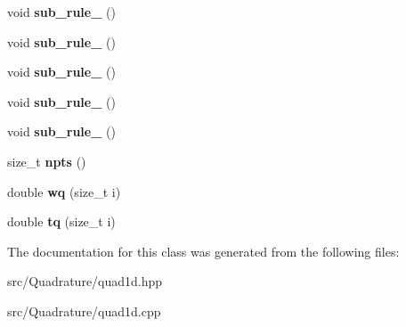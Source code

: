\begin{DoxyCompactItemize}
void {\bfseries sub\+\_\+rule\+\_} ()
\item 
\mbox{\label{classHArDCore3D_1_1LegendreGauss_a50b4238c7cade3272efe46641e1d2d3f}} 
void {\bfseries sub\+\_\+rule\+\_} ()
\item 
\mbox{\label{classHArDCore3D_1_1LegendreGauss_ae6a8077dd8cf9fc76ed1234b93691049}} 
void {\bfseries sub\+\_\+rule\+\_} ()
\item 
\mbox{\label{classHArDCore3D_1_1LegendreGauss_aad37934da18110fd078f1950a575fd3d}} 
void {\bfseries sub\+\_\+rule\+\_} ()
\item 
\mbox{\label{classHArDCore3D_1_1LegendreGauss_a6b7095506bd1d218c28f5778c6dea545}} 
void {\bfseries sub\+\_\+rule\+\_} ()
\item 
\mbox{\label{classHArDCore3D_1_1LegendreGauss_a1251635135ab00a28e128a058288e440}} 
size\+\_\+t {\bfseries npts} ()
\item 
\mbox{\label{classHArDCore3D_1_1LegendreGauss_a2800eb7a7c2648b1edb77231ef42608a}} 
double {\bfseries wq} (size\+\_\+t i)
\item 
\mbox{\label{classHArDCore3D_1_1LegendreGauss_aa10e032f4ea04323773b23177b4124ee}} 
double {\bfseries tq} (size\+\_\+t i)
\end{DoxyCompactItemize}


The documentation for this class was generated from the following files\+:\begin{DoxyCompactItemize}
\item 
src/\+Quadrature/quad1d.\+hpp\item 
src/\+Quadrature/quad1d.\+cpp\end{DoxyCompactItemize}
